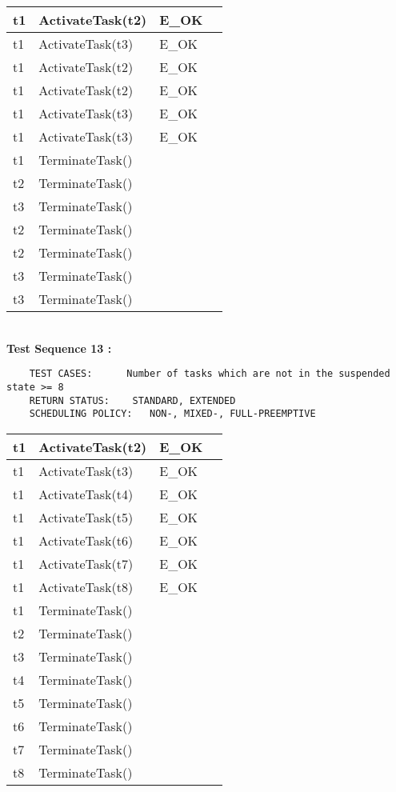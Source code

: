 \documentclass[10pt]{article}
\newlength{\Li}\settowidth{\Li}{Running}
\newlength{\Lii}\setlength{\Lii}{7cm}
\newlength{\Liiii}\setlength{\Liiii}{0.9cm}
\newlength{\Liii}\setlength{\Liii}{\textwidth} \addtolength{\Liii}{-\Li} \addtolength{\Liii}{-\Lii} \addtolength{\Liii}{-\Liiii}
\begin{document}
	\begin{supertabular}{|p{\Li}|p{\Lii}|p{\Liii}|p{\Liiii}|} \hline
	t1	& ActivateTask(t2) 			& E\_OK				& \\ \hline 
	t1	& ActivateTask(t3) 			& E\_OK				& \\ \hline 
	t1	& ActivateTask(t2) 			& E\_OK				& \\ \hline 
	t1	& ActivateTask(t2) 			& E\_OK				& \\ \hline 
	t1	& ActivateTask(t3) 			& E\_OK				& \\ \hline 
	t1	& ActivateTask(t3) 			& E\_OK				& \\ \hline 
	t1	& TerminateTask()				&					&  \\ \hline
	t2	& TerminateTask()				&					&  \\ \hline
	t3	& TerminateTask()				&					&  \\ \hline
	t2	& TerminateTask()				&					&  \\ \hline
	t2	& TerminateTask()				&					&  \\ \hline
	t3	& TerminateTask()				&					&  \\ \hline
	t3	& TerminateTask()				&					&  \\ \hline
	\end{supertabular} \\
	
	\textbf{Test Sequence 13 :}
	\begin{lstlisting}
	TEST CASES:		 Number of tasks which are not in the suspended state >= 8
	RETURN STATUS:	  STANDARD, EXTENDED
	SCHEDULING POLICY:   NON-, MIXED-, FULL-PREEMPTIVE
	\end{lstlisting}
	

	\begin{supertabular}{|p{\Li}|p{\Lii}|p{\Liii}|p{\Liiii}|} \hline
	t1	& ActivateTask(t2) 			& E\_OK				& \\ \hline 
	t1	& ActivateTask(t3) 			& E\_OK				& \\ \hline 
	t1	& ActivateTask(t4) 			& E\_OK				& \\ \hline 
	t1	& ActivateTask(t5) 			& E\_OK				& \\ \hline 
	t1	& ActivateTask(t6) 			& E\_OK				& \\ \hline 
	t1	& ActivateTask(t7) 			& E\_OK				& \\ \hline 
	t1	& ActivateTask(t8) 			& E\_OK				& \\ \hline 
	t1	& TerminateTask()				&					&  \\ \hline
	t2	& TerminateTask()				&					&  \\ \hline
	t3	& TerminateTask()				&					&  \\ \hline
	t4	& TerminateTask()				&					&  \\ \hline
	t5	& TerminateTask()				&					&  \\ \hline
	t6	& TerminateTask()				&					&  \\ \hline
	t7	& TerminateTask()				&					&  \\ \hline
	t8	& TerminateTask()				&					&  \\ \hline
	\end{supertabular} \\
	
\end{document}
